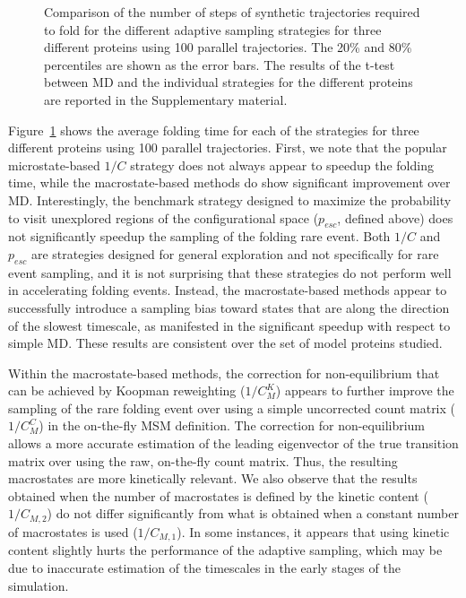 \begin{figure}[t!]
\begin{subfigure}[t]{0.5\textwidth}
  \end{subfigure}
  \caption{Comparison of the number of steps of synthetic trajectories required
  to fold for the different adaptive sampling strategies for three different
  proteins using 100 parallel trajectories. The 20\% and 80\% percentiles are
  shown as the error bars. The results of the t-test between MD and the
  individual strategies for the different proteins are reported in the Supplementary material.}
  \label{fig:Time_fold}
\end{figure}

Figure~\ref{fig:Time_fold} shows the average folding time for each of the
strategies for three different proteins using 100 parallel trajectories. First, we note that the
popular microstate-based $1/C$ strategy does not always appear to speedup the
folding time, while the macrostate-based methods do show significant
improvement over MD. 
Interestingly, the benchmark strategy designed to maximize the probability to
visit unexplored regions of the configurational space  ($p_{esc}$, defined
above) does not significantly speedup the sampling of the folding rare event.
Both $1/C$ and $p_{esc}$ are strategies designed for general exploration and
not specifically for rare event sampling, and it is not surprising that these
strategies do not perform well in accelerating folding events.
Instead, the macrostate-based methods appear to successfully introduce a
sampling bias toward states that are along the direction of the slowest
timescale, as manifested in the significant speedup with respect to simple MD.
These results are consistent over the set of model proteins studied.

Within the macrostate-based methods, the correction for non-equilibrium that
can be achieved by Koopman reweighting ($1/C_M^K$) appears to further improve
the sampling of the rare folding event over using a simple uncorrected count
matrix ($1/C_M^C$) in the on-the-fly MSM definition. The correction for
non-equilibrium allows a more accurate estimation of the leading eigenvector of
the true transition matrix over using the raw, on-the-fly count matrix. Thus,
the resulting macrostates are more kinetically relevant. We also observe that
the results obtained when the number of macrostates is defined by the kinetic
content ($1/C_{M, 2}$) do not differ significantly from what is obtained when a constant number
of macrostates is used ($1/C_{M, 1}$). In some instances, it appears that using
kinetic content slightly hurts the performance of the adaptive sampling, which
may be due to inaccurate estimation of the timescales in the early stages
of the simulation.

